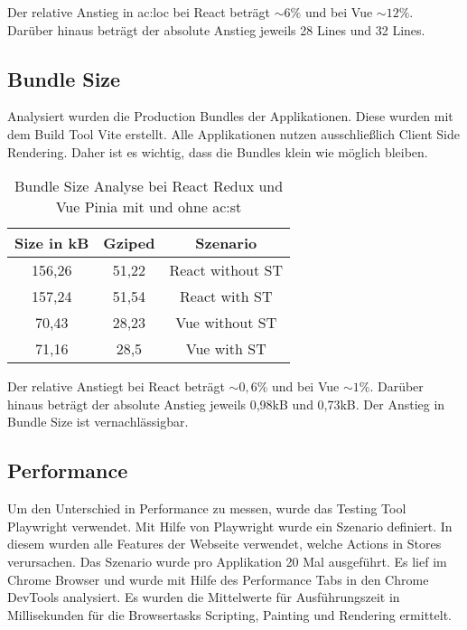 Der relative Anstieg in \acrshort{ac:loc} bei React beträgt $\sim6\%$ und bei Vue $\sim12\%$. Darüber hinaus beträgt der absolute Anstieg jeweils 28 Lines und 32 Lines.

\subsection{Bundle Size}

Analysiert wurden die Production Bundles der Applikationen. Diese wurden mit dem Build Tool Vite erstellt. Alle Applikationen nutzen ausschließlich Client Side Rendering. Daher ist es wichtig, dass die Bundles klein wie möglich bleiben.

\begin{table}[h!]
  \caption{Bundle Size Analyse bei React Redux und Vue Pinia mit und ohne \acrshort{ac:st}}
  \label{tab:bundSizeAnalysisSTvsNoST}

  \begin{center}
    \begin{tabular}{|c|c|c|} 
    \hline
    Size in kB & Gziped & Szenario \\ [0.5ex]
    \hline\hline
    156,26 & 51,22 & React without ST \\
    \hline
    157,24 & 51,54 & React with ST \\
    \hline
    70,43 & 28,23 & Vue without ST \\
    \hline
    71,16 & 28,5 & Vue with ST \\
    \hline
    \end{tabular}
  \end{center}
\end{table}

Der relative Anstiegt bei React beträgt $\sim0,6\%$ und bei Vue $\sim1\%$. Darüber hinaus beträgt der absolute Anstieg jeweils 0,98kB und 0,73kB. Der Anstieg in Bundle Size ist vernachlässigbar.

\subsection{Performance}

Um den Unterschied in Performance zu messen, wurde das Testing Tool Playwright verwendet. Mit Hilfe von Playwright wurde ein Szenario definiert. In diesem wurden alle Features der Webseite verwendet, welche Actions in Stores verursachen. Das Szenario wurde pro Applikation 20 Mal ausgeführt. Es lief im Chrome Browser und wurde mit Hilfe des Performance Tabs in den Chrome DevTools analysiert. Es wurden die Mittelwerte für Ausführungszeit in Millisekunden für die Browsertasks Scripting, Painting und Rendering ermittelt.

